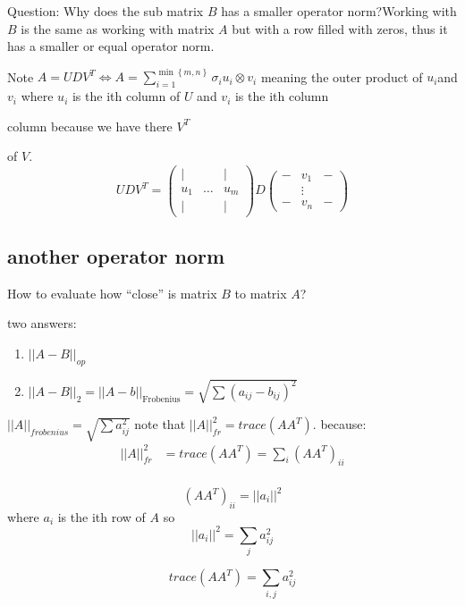 Question: Why does the sub matrix $B$ has a smaller operator norm?Working
with $B$ is the same as working with matrix $A$ but with a row filled
with zeros, thus it has a smaller or equal operator norm.

Note $A=UDV^{T}\iff A=\sum\limits _{i=1}^{\min\left\{ m,n\right\} }\sigma_{i}u_{i}\otimes v_{i}$
meaning the outer product of $u_{i}$and $v_{i}$ where $u_{i}$ is
the ith column of $U$ and $v_{i}$ is the ith column %
\begin{insight}
column because we have there $V^{T}$%
\end{insight}
of $V$. 
\[
UDV^{T}=\left(\begin{matrix}| &  & |\\
u_{1} & \dots & u_{m}\\
| &  & |
\end{matrix}\right)D\left(\begin{matrix}- & v_{1} & -\\
 & \vdots\\
- & v_{n} & -
\end{matrix}\right)
\]


\subsection{another operator norm}
\begin{xca}
How to evaluate how ``close'' is matrix $B$ to matrix $A$?
\begin{sol}
two answers:
\begin{enumerate}
\item $\left|\left|A-B\right|\right|_{op}$
\item $\left|\left|A-B\right|\right|_{2}=\left|\left|A-b\right|\right|_{\text{Frobenius}}=\sqrt{\sum\left(a_{ij}-b_{ij}\right)^{2}}$
\end{enumerate}
\end{sol}

\end{xca}

$\left|\left|A\right|\right|_{frobenius}=\sqrt{\sum a_{ij}^{2}}$
note that $\left|\left|A\right|\right|_{fr}^{2}=trace\left(AA^{T}\right)$.
because:
\begin{align*}
\left|\left|A\right|\right|_{fr}^{2} & =trace\left(AA^{T}\right)=\sum_{i}\left(AA^{T}\right)_{ii}\\
\end{align*}
 
\[
\left(AA^{T}\right)_{ii}=\left|\left|a_{i}\right|\right|^{2}
\]
 where $a_{i}$ is the ith row of $A$ so 
\[
\left|\left|a_{i}\right|\right|^{2}=\sum_{j}a_{ij}^{2}
\]
\begin{insight}
\[
trace\left(AA^{T}\right)=\sum_{i,j}a_{ij}^{2}
\]
\end{insight}

